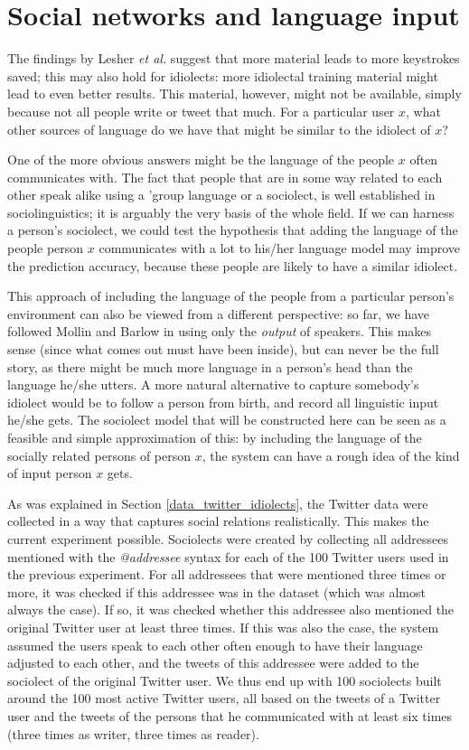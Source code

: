 \documentclass[11pt]{article}
\begin{document}
{\section{Social networks and language input} \label{input_networks}

The findings by Lesher {\em et al.}  suggest that more material leads to more keystrokes saved; this may also hold for idiolects: more idiolectal training material might lead to even better results. This material, however, might not be available, simply because not all people write or tweet that much. For a particular user $x$, what other sources of language do we have that might be similar to the idiolect of $x$?

One of the more obvious answers might be the language of the people $x$ often communicates with. The fact that people that are in some way related to each other speak alike using a 'group language or a sociolect, is well established in sociolinguistics; it is arguably the very basis of the whole field. If we can harness a person's sociolect, we could test the hypothesis that adding the language of the people person $x$ communicates with a lot to his/her language model may improve the prediction accuracy, because these people are likely to have a similar idiolect.

This approach of including the language of the people from a particular person's environment can also be viewed from a different perspective: so far, we have followed Mollin  and Barlow in using only the \emph{output} of speakers. This makes sense (since what comes out must have been inside), but can never be the full story, as there might be much more language in a person's head than the language he/she utters. A more natural alternative to capture somebody's idiolect would be to follow a person from birth, and record all linguistic input he/she gets. The sociolect model that will be constructed here can be seen as a feasible and simple approximation of this: by including the language of the socially related persons of person $x$, the system can have a rough idea of the kind of input person $x$ gets.

As was explained in Section \ref{data_twitter_idiolects}, the Twitter data were collected in a way that captures social relations realistically. This makes the current experiment possible. Sociolects were created by collecting all addressees mentioned with the \emph{@addressee} syntax for each of the 100 Twitter users used in the previous experiment. For all addressees that were mentioned three times or more, it was checked if this addressee was in the dataset (which was almost always the case). If so, it was checked whether this addressee also mentioned the original Twitter user at least three times. If this was also the case, the system assumed the users speak to each other often enough to have their language adjusted to each other, and the tweets of this addressee were added to the sociolect of the original Twitter user. We thus end up with 100 sociolects built around the 100 most active Twitter users, all based on the tweets of a Twitter user and the tweets of the persons that he communicated with at least six times (three times as writer, three times as reader).

}
\end{document}

